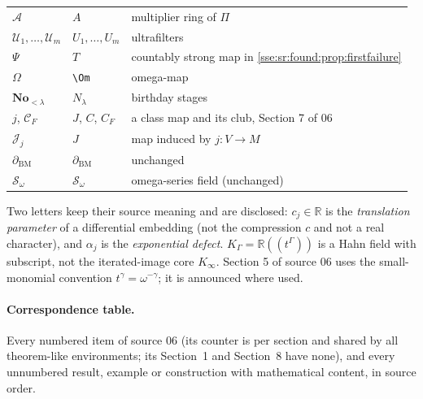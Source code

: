 \documentclass[11pt,a4paper]{article}
\numberwithin{equation}{section}
\theoremstyle{plain}
\theoremstyle{definition}
\theoremstyle{remark}
\newcommand{\No}{\mathbf{No}}
\newcommand{\R}{\mathbb{R}}
\newcommand{\code}[1]{\texttt{\small #1}}
\newcommand{\OmSeriessr}{\mathcal{S}_{\omega}}%
\newcommand{\BMsr}{\partial_{\mathrm{BM}}}%
\begin{document}
\begin{longtable}{P{38mm}P{38mm}P{72mm}}
$\mathcal A$ & $A$ & multiplier ring of $\Pi$ \\
$\mathcal U_1,\dots,\mathcal U_m$ & $U_1,\dots,U_m$ & ultrafilters \\
$\Psi$ & $T$ & countably strong map in \cref{sse:sr:found:prop:firstfailure} \\
$\Omega$ & \code{\textbackslash Om} & omega-map \\
$\No_{<\lambda}$ & $N_\lambda$ & birthday stages \\
$j$, $\mathcal C_F$ & $J$, $C$, $C_F$ & a class map and its club, Section 7 of 06 \\
$\mathcal J_j$ & $J$ & map induced by $j:V\to M$ \\
$\BMsr$ & $\partial_{\mathrm{BM}}$ & unchanged \\
$\OmSeriessr$ & $\mathcal S_\omega$ & omega-series field (unchanged) \\
\bottomrule
\end{longtable}
\endgroup

Two letters keep their source meaning and are disclosed: $c_j\in\R$ is the
\emph{translation parameter} of a differential embedding (not the compression
$c$ and not a real character), and $\alpha_j$ is the \emph{exponential
defect}. $K_\Gamma=\R((t^\Gamma))$ is a Hahn field with subscript, not the
iterated-image core $K_\infty$. Section 5 of source 06 uses the small-monomial
convention $t^\gamma=\omega^{-\gamma}$; it is announced where used.

\paragraph{Correspondence table.} Every numbered item of source 06 (its
counter is per section and shared by all theorem-like environments; its
Section~1 and Section~8 have none), and every unnumbered result, example or
construction with mathematical content, in source order.
\end{document}
